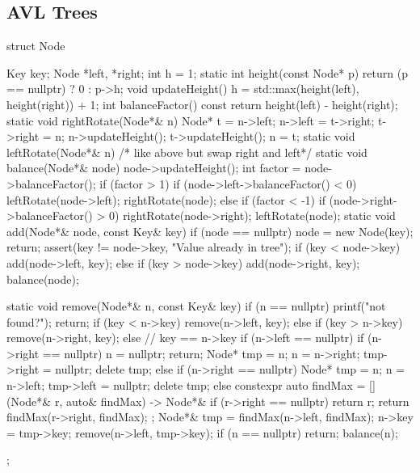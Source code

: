 \documentclass[11pt,a4paper]{report}
\begin{document}
\subsection*{AVL Trees}
\begin{cpp}
struct Node {
    Key key;
    Node *left, *right;
    int h = 1;
    static int height(const Node* p) { return (p == nullptr) ? 0 : p->h; }
    void updateHeight() { h = std::max(height(left), height(right)) + 1; }
    int balanceFactor() const { return height(left) - height(right); }
    static void rightRotate(Node*& n) {
        Node* t = n->left;
        n->left = t->right;
        t->right = n;
        n->updateHeight();
        t->updateHeight();
        n = t;
    }
    static void leftRotate(Node*& n) { /* like above but swap right and left*/ }
    static void balance(Node*& node) {
        node->updateHeight();
        int factor = node->balanceFactor();
        if (factor > 1) {
            if (node->left->balanceFactor() < 0) leftRotate(node->left);
            rightRotate(node);
        } else if (factor < -1) {
            if (node->right->balanceFactor() > 0) rightRotate(node->right);
            leftRotate(node);
        }
    }
    static void add(Node*& node, const Key& key) {
        if (node == nullptr) { node = new Node(key); return; }
        assert(key != node->key, "Value already in tree");
        if (key < node->key) add(node->left, key);
        else if (key > node->key) add(node->right, key);
        balance(node);
    }

    static void remove(Node*& n, const Key& key) {
        if (n == nullptr) { printf("not found?\n"); return; }
        if (key < n->key) remove(n->left, key);
        else if (key > n->key) remove(n->right, key);
        else { // key == n->key
            if (n->left == nullptr) {
                if (n->right == nullptr) { n = nullptr; return; }
                Node* tmp = n;
                n = n->right;
                tmp->right = nullptr;
                delete tmp;
            } else if (n->right == nullptr) {
                Node* tmp = n;
                n = n->left;
                tmp->left = nullptr;
                delete tmp;
            } else {
                constexpr auto findMax = [](Node*& r, auto& findMax) -> Node*& {
                        if (r->right == nullptr) return r;
                        return findMax(r->right, findMax);
                    };
                Node*& tmp = findMax(n->left, findMax);
                n->key = tmp->key;
                remove(n->left, tmp->key);
            }
        }
        if (n == nullptr) return;
        balance(n);
    }
};
\end{cpp}
\end{document}
